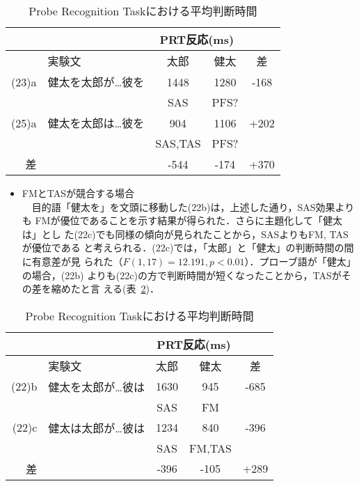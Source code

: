 \begin{table}
\begin{center}
\caption{Probe Recognition Taskにおける平均判断時間}
\label{table:pfssastas}
\begin{tabular}{|r|l|c|c|c|} \hline
    \multicolumn{2}{|c|}{} & \multicolumn{2}{c|}{PRT反応(ms)} &   \\ \hline
      & 実験文 & 太郎 & 健太 & 差 \\ \hline
(23)a & 健太を太郎が\ldots 彼を & 1448 & 1280 & -168 \\
      &                    & SAS & PFS? & \\ \hline
(25)a & 健太を太郎は\ldots 彼を & 904 & 1106 & +202\\
      &                    & SAS,TAS & PFS? & \\ \hline
  差  &                    & -544 & -174 & +370\\ \hline
\end{tabular}
\end{center}
\end{table}

\begin{itemize}
  \item FMとTASが競合する場合\\
　目的語「健太を」を文頭に移動した(22b)は，上述した通り，SAS効果よりも
FMが優位であることを示す結果が得られた．さらに主題化して「健太は」とし
た(22c)でも同様の傾向が見られたことから，SASよりもFM, TASが優位である
と考えられる．(22c)では，「太郎」と「健太」の判断時間の間に有意差が見
られた（$F(1,17)=12.191, p<0.01$）．プローブ語が「健太」の場合，(22b)
よりも(22c)の方で判断時間が短くなったことから，TASがその差を縮めたと言
える(表~\ref{table:fmtas2})．
\end{itemize}

\begin{table}
\begin{center}
\caption{Probe Recognition Taskにおける平均判断時間}
\label{table:fmtas2}
\begin{tabular}{|r|l|c|c|c|} \hline
    \multicolumn{2}{|c|}{} & \multicolumn{2}{c|}{PRT反応(ms)} &   \\ \hline
      & 実験文 & 太郎 & 健太 & 差 \\ \hline
(22)b & 健太を太郎が\ldots 彼は  & 1630 & 945 &-685 \\
      &                    & SAS & FM & \\ \hline
(22)c & 健太は太郎が\ldots 彼は & 1234 & 840 & -396\\
      &                    & SAS & FM,TAS & \\ \hline
  差  &                    & -396 & -105 & +289\\ \hline
\end{tabular}
\end{center}
\end{table}

